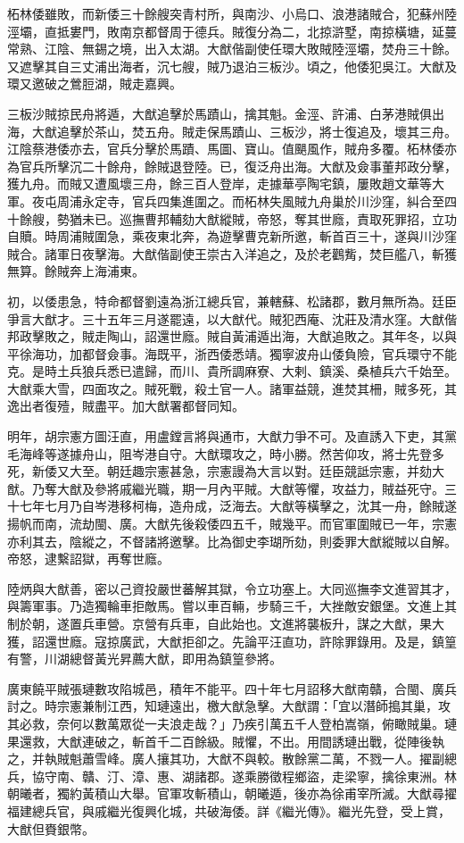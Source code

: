 \begin{pinyinscope}
柘林倭雖敗，而新倭三十餘艘突青村所，與南沙、小烏口、浪港諸賊合，犯蘇州陸涇壩，直抵婁門，敗南京都督周于德兵。賊復分為二，北掠滸墅，南掠橫塘，延蔓常熟、江陰、無錫之境，出入太湖。大猷偕副使任環大敗賊陸涇壩，焚舟三十餘。又遮擊其自三丈浦出海者，沉七艘，賊乃退泊三板沙。頃之，他倭犯吳江。大猷及環又邀破之鶯脰湖，賊走嘉興。

三板沙賊掠民舟將遁，大猷追擊於馬蹟山，擒其魁。金涇、許浦、白茅港賊俱出海，大猷追擊於茶山，焚五舟。賊走保馬蹟山、三板沙，將士復追及，壞其三舟。江陰蔡港倭亦去，官兵分擊於馬蹟、馬圖、寶山。值颶風作，賊舟多覆。柘林倭亦為官兵所擊沉二十餘舟，餘賊退登陸。已，復泛舟出海。大猷及僉事董邦政分擊，獲九舟。而賊又遭風壞三舟，餘三百人登岸，走據華亭陶宅鎮，屢敗趙文華等大軍。夜屯周浦永定寺，官兵四集進圍之。而柘林失風賊九舟巢於川沙窪，糾合至四十餘艘，勢猶未已。巡撫曹邦輔劾大猷縱賊，帝怒，奪其世廕，責取死罪招，立功自贖。時周浦賊圍急，乘夜東北奔，為遊擊曹克新所邀，斬首百三十，遂與川沙窪賊合。諸軍日夜擊海。大猷偕副使王崇古入洋追之，及於老鸛觜，焚巨艦八，斬獲無算。餘賊奔上海浦東。

初，以倭患急，特命都督劉遠為浙江總兵官，兼轄蘇、松諸郡，數月無所為。廷臣爭言大猷才。三十五年三月遂罷遠，以大猷代。賊犯西庵、沈莊及清水窪。大猷偕邦政擊敗之，賊走陶山，詔還世廕。賊自黃浦遁出海，大猷追敗之。其年冬，以與平徐海功，加都督僉事。海既平，浙西倭悉靖。獨寧波舟山倭負險，官兵環守不能克。是時土兵狼兵悉已遣歸，而川、貴所調麻寮、大剌、鎮溪、桑植兵六千始至。大猷乘大雪，四面攻之。賊死戰，殺土官一人。諸軍益競，進焚其柵，賊多死，其逸出者復殪，賊盡平。加大猷署都督同知。

明年，胡宗憲方圖汪直，用盧鏜言將與通市，大猷力爭不可。及直誘入下吏，其黨毛海峰等遂據舟山，阻岑港自守。大猷環攻之，時小勝。然苦仰攻，將士先登多死，新倭又大至。朝廷趣宗憲甚急，宗憲謾為大言以對。廷臣競詆宗憲，并劾大猷。乃奪大猷及參將戚繼光職，期一月內平賊。大猷等懼，攻益力，賊益死守。三十七年七月乃自岑港移柯梅，造舟成，泛海去。大猷等橫擊之，沈其一舟，餘賊遂揚帆而南，流劫閩、廣。大猷先後殺倭四五千，賊幾平。而官軍圍賊已一年，宗憲亦利其去，陰縱之，不督諸將邀擊。比為御史李瑚所劾，則委罪大猷縱賊以自解。帝怒，逮繫詔獄，再奪世廕。

陸炳與大猷善，密以己資投嚴世蕃解其獄，令立功塞上。大同巡撫李文進習其才，與籌軍事。乃造獨輪車拒敵馬。嘗以車百輛，步騎三千，大挫敵安銀堡。文進上其制於朝，遂置兵車營。京營有兵車，自此始也。文進將襲板升，謀之大猷，果大獲，詔還世廕。寇掠廣武，大猷拒卻之。先論平汪直功，許除罪錄用。及是，鎮篁有警，川湖總督黃光昇薦大猷，即用為鎮篁參將。

廣東饒平賊張璉數攻陷城邑，積年不能平。四十年七月詔移大猷南贛，合閩、廣兵討之。時宗憲兼制江西，知璉遠出，檄大猷急擊。大猷謂：「宜以潛師搗其巢，攻其必救，奈何以數萬眾從一夫浪走哉？」乃疾引萬五千人登柏嵩嶺，俯瞰賊巢。璉果還救，大猷連破之，斬首千二百餘級。賊懼，不出。用間誘璉出戰，從陣後執之，并執賊魁蕭雪峰。廣人攘其功，大猷不與較。散餘黨二萬，不戮一人。擢副總兵，協守南、贛、汀、漳、惠、湖諸郡。遂乘勝徵程鄉盜，走梁寧，擒徐東洲。林朝曦者，獨約黃積山大舉。官軍攻斬積山，朝曦遁，後亦為徐甫宰所滅。大猷尋擢福建總兵官，與戚繼光復興化城，共破海倭。詳《繼光傳》。繼光先登，受上賞，大猷但賚銀幣。


\end{pinyinscope}

